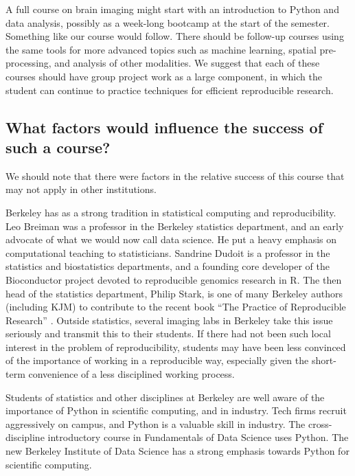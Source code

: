 A full course on brain imaging might start with an introduction to Python and
data analysis, possibly as a week-long bootcamp at the start of the semester.
Something like our course would follow.  There should be follow-up courses
using the same tools for more advanced topics such as machine learning,
spatial pre-processing, and analysis of other modalities. We suggest that each
of these courses should have group project work as a large component, in which
the student can continue to practice techniques for efficient reproducible
research.

\subsection{What factors would influence the success of such a course?}

We should note that there were factors in the relative success of this
course that may not apply in other institutions.

Berkeley has as a strong tradition in statistical computing and
reproducibility.  Leo Breiman was a professor in the Berkeley statistics
department, and an early advocate of what we would now call data science.  He
put a heavy emphasis on computational teaching to statisticians.  Sandrine
Dudoit is a professor in the statistics and biostatistics departments, and a
founding core developer of the Bioconductor project devoted to reproducible
genomics research in R.  The then head of the statistics department, Philip
Stark, is one of many Berkeley authors (including KJM) to contribute to the
recent book ``The Practice of Reproducible Research''
\citep{kitzes2017practice}. Outside statistics, several imaging labs in
Berkeley take this issue seriously and transmit this to their students.  If
there had not been such local interest in the problem of reproducibility,
students may have been less convinced of the importance of
working in a reproducible way, especially given the short-term convenience
of a less disciplined working process.


Students of statistics and other disciplines at Berkeley are well aware of the
importance of Python in scientific computing, and in industry.  Tech firms
recruit aggressively on campus, and Python is a valuable skill in industry.
The cross-discipline introductory course in Fundamentals of Data Science uses
Python. The new Berkeley Institute of Data Science has a strong emphasis
towards Python for scientific computing.

